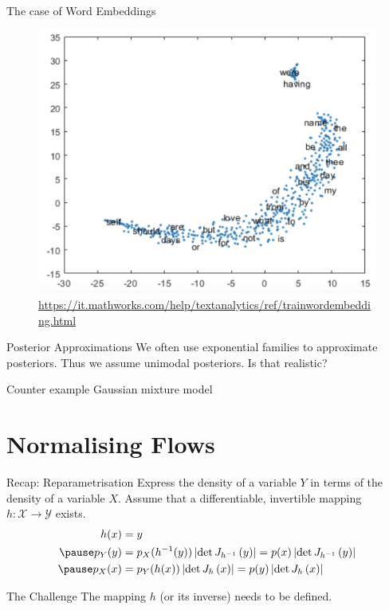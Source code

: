 \documentclass[14pt]{beamer}
\begin{document}
\begin{frame}{The case of Word Embeddings}
\pause
\begin{figure}
\includegraphics[scale=.2]{wordcloud.png}
\caption{\url{https://it.mathworks.com/help/textanalytics/ref/trainwordembedding.html}}
\end{figure}
\end{frame}

\begin{frame}{Posterior Approximations}
We often use exponential families to approximate posteriors. Thus we assume unimodal posteriors. Is that realistic?
\pause
\begin{block}{Counter example}
Gaussian mixture model
\end{block}
\end{frame}

\section{Normalising Flows}

\begin{frame}
\tableofcontents[current]
\end{frame}

\begin{frame}{Recap: Reparametrisation}
Express the density of a variable $ Y $ in terms of the density of a variable $ X $. Assume that a differentiable, invertible mapping
$ h: \mathcal{X} \rightarrow \mathcal{Y} $ exists.
\begin{equation*}
\begin{aligned}
h(x) &= y \\ \pause
p_{Y}(y) &= p_{X}(h^{-1}(y))\djac{h^{-1}}{y} = p(x)\djac{h^{-1}}{y}  \\ \pause
p_{X}(x) &= p_{Y}(h(x))\djac{h}{x} = p(y)\djac{h}{x}
\end{aligned}
\end{equation*}
\pause
\begin{block}{The Challenge}
The mapping $ h $ (or its inverse) needs to be defined.
\end{block}
\end{frame}
\end{document}
